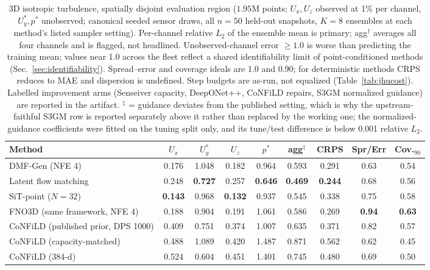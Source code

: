 \documentclass[aip,pof,reprint,amsmath,amssymb,superscriptaddress]{revtex4-1}
\newcommand{\dmfgen}{DMF-Gen}
\begin{document}
\begin{table}[tbp]
\caption{\label{tab:jhu}3D isotropic turbulence, spatially disjoint
evaluation region ($1.95$M points; $U_x,U_z$ observed at 1\% per channel,
$U_y^*,p^*$ unobserved; canonical seeded sensor draws, all $n{=}50$ held-out
snapshots, $K{=}8$ ensembles at each method's listed sampler setting).
Per-channel relative $L_2$ of the ensemble mean is primary; agg$^\dagger$
averages all four channels and is flagged, not headlined. Unobserved-channel
error $\ge 1.0$ is worse than predicting the training mean; values near 1.0
across the fleet reflect a shared identifiability limit of point-conditioned
methods (Sec.~\ref{sec:identifiability}). Spread--error and coverage ideals
are 1.0 and 0.90; for deterministic methods CRPS reduces to MAE and
dispersion is undefined. Step budgets are as-run, not equalized
(Table~\ref{tab:jhucost}). Labelled improvement arms (Senseiver capacity,
DeepONet++, CoNFiLD repairs, S3GM normalized guidance) are reported in the
artifact. $^{\ddagger}$ = guidance deviates from the published setting, which
is why the upstream-faithful S3GM row is reported separately above it rather
than replaced by the working one; the normalized-guidance coefficients were
fitted on the tuning split only, and its tune/test difference is below 0.001
relative $L_2$.}
\footnotesize
\begin{ruledtabular}
\begin{tabular}{lcccccccc}
Method & $U_x$ & $U_y^*$ & $U_z$ & $p^*$ & agg$^\dagger$ & CRPS & Spr/Err & Cov.$_{90}$ \\
\hline
\dmfgen{} (NFE 4) & 0.176 & 1.048 & 0.182 & 0.964 & 0.593 & 0.291 & 0.63 & 0.54 \\
Latent flow matching & 0.248 & \textbf{0.727} & 0.257 & \textbf{0.646} & \textbf{0.469} & \textbf{0.244} & 0.68 & 0.56 \\
SiT-point ($N{=}32$) & \textbf{0.143} & 0.968 & \textbf{0.132} & 0.937 & 0.545 & 0.338 & 0.75 & 0.58 \\
FNO3D (same framework, NFE 4) & 0.188 & 0.904 & 0.191 & 1.061 & 0.586 & 0.269 & \textbf{0.94} & \textbf{0.63} \\
CoNFiLD (published prior, DPS 1000) & 0.409 & 0.751 & 0.374 & 1.007 & 0.635 & 0.371 & 0.82 & 0.57 \\
CoNFiLD (capacity-matched) & 0.488 & 1.089 & 0.420 & 1.487 & 0.871 & 0.562 & 0.62 & 0.45 \\
CoNFiLD (384-d) & 0.524 & 0.604 & 0.451 & 1.401 & 0.745 & 0.480 & 0.69 & 0.50 \\

\end{tabular}
\end{ruledtabular}
\end{table}
\end{document}
